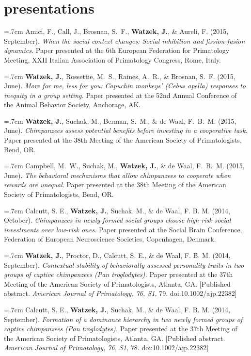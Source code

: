 \documentclass[]{friggeri-cv}
\begin{document}
\section{presentations}

\hangindent=.7cm Amici, F., Call, J., Brosnan, S.~F., \textbf{Watzek, J.}, \& Aureli, F. (2015, September). \emph{When the social context changes: Social inhibition and fission-fusion dynamics.} Paper presented at the 6th European Federation for Primatology Meeting, XXII Italian Association of Primatology Congress, Rome, Italy.

\hangindent=.7cm \textbf{Watzek, J.}, Rossettie, M.~S., Raines, A.~R., \& Brosnan, S.~F. (2015, June). \emph{More for me, less for you: Capuchin monkeys' (\emph{Cebus apella}) responses to inequity in a group setting.} Paper presented at the 52nd Annual Conference of the Animal Behavior Society, Anchorage, AK.

\hangindent=.7cm \textbf{Watzek, J.}, Suchak, M., Berman, S.~M., \& de Waal, F.~B.~M. (2015, June). \emph{Chimpanzees assess potential benefits before investing in a cooperative task}. Paper presented at the 38th Meeting of the American Society of Primatologists, Bend, OR.

\hangindent=.7cm Campbell, M.~W., Suchak, M., \textbf{Watzek, J.}, \& de Waal, F.~B.~M. (2015, June). \emph{The behavioral mechanisms that allow chimpanzees to cooperate when rewards are unequal}. Paper presented at the 38th Meeting of the American Society of Primatologists, Bend, OR.

\hangindent=.7cm Calcutt, S. E., \textbf{Watzek, J.}, Suchak, M., \& de Waal, F. B. M. (2014, October). \emph{Chimpanzees in newly formed social groups choose high-risk social investments over low-risk ones.} Paper presented at the Social Brain Conference, Federation of European Neuroscience Societies, Copenhagen, Denmark.

\hangindent=.7cm \textbf{Watzek, J.}, Proctor, D., Calcutt, S. E., \& de Waal, F. B. M. (2014, September). \emph{Contextual stability of behaviorally assessed personality traits in two groups of captive chimpanzees (\textit{Pan troglodytes}).} Paper presented at the 37th Meeting of the American Society of Primatologists, Atlanta, GA. [Published abstract. \emph{American Journal of Primatology, 76, S1,} 79. doi:10.1002/ajp.22382]

\hangindent=.7cm Calcutt, S. E., \textbf{Watzek, J.}, Suchak, M., \& de Waal, F. B. M. (2014, September). \emph{Formation of a dominance hierarchy in two newly formed groups of captive chimpanzees (\textit{Pan troglodytes}).} Paper presented at the 37th Meeting of the American Society of Primatologists, Atlanta, GA. [Published abstract. \emph{American Journal of Primatology, 76, S1,} 78. doi:10.1002/ajp.22382]
\end{document}
